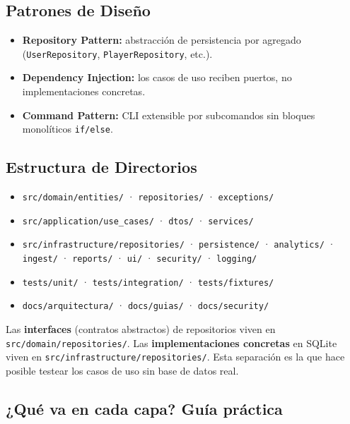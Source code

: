 \documentclass[11pt,a4paper]{article}
\newcommand{\fpath}[1]{\texttt{\small #1}}
\begin{document}
\subsection{Patrones de Diseño}
\begin{itemize}[nosep]
  \item \textbf{Repository Pattern:} abstracción de persistencia por agregado (\fpath{UserRepository}, \fpath{PlayerRepository}, etc.).
  \item \textbf{Dependency Injection:} los casos de uso reciben puertos, no implementaciones concretas.
  \item \textbf{Command Pattern:} CLI extensible por subcomandos sin bloques monolíticos \fpath{if/else}.
\end{itemize}

\subsection{Estructura de Directorios}

\begin{itemize}[nosep]
  \item \fpath{src/domain/entities/} · \fpath{repositories/} · \fpath{exceptions/}
  \item \fpath{src/application/use\_cases/} · \fpath{dtos/} · \fpath{services/}
  \item \fpath{src/infrastructure/repositories/} · \fpath{persistence/} · \fpath{analytics/} · \fpath{ingest/} · \fpath{reports/} · \fpath{ui/} · \fpath{security/} · \fpath{logging/}
  \item \fpath{tests/unit/} · \fpath{tests/integration/} · \fpath{tests/fixtures/}
  \item \fpath{docs/arquitectura/} · \fpath{docs/guias/} · \fpath{docs/security/}
\end{itemize}

\begin{notebox}
Las \textbf{interfaces} (contratos abstractos) de repositorios viven en \fpath{src/domain/repositories/}. Las \textbf{implementaciones concretas} en SQLite viven en \fpath{src/infrastructure/repositories/}. Esta separación es la que hace posible testear los casos de uso sin base de datos real.
\end{notebox}

\subsection{¿Qué va en cada capa? Guía práctica}
\end{document}
